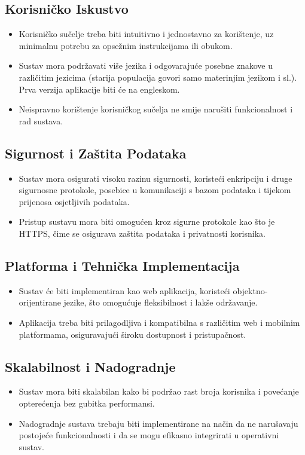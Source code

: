 \subsection*{Korisničko Iskustvo}
\begin{itemize}
    \item Korisničko sučelje treba biti intuitivno i jednostavno za korištenje, uz minimalnu potrebu za opsežnim instrukcijama ili obukom.
    \item Sustav mora podržavati više jezika i odgovarajuće posebne znakove u različitim jezicima (starija populacija govori samo materinjim jezikom i sl.). Prva verzija aplikacije biti će na engleskom. 
    \item Neispravno korištenje korisničkog sučelja ne smije narušiti funkcionalnost i rad sustava.
\end{itemize}

\subsection*{Sigurnost i Zaštita Podataka}
\begin{itemize}
    \item Sustav mora osigurati visoku razinu sigurnosti, koristeći enkripciju i druge sigurnosne protokole, posebice u komunikaciji s bazom podataka i tijekom prijenosa osjetljivih podataka.
    \item Pristup sustavu mora biti omogućen kroz sigurne protokole kao što je HTTPS, čime se osigurava zaštita podataka i privatnosti korisnika.
\end{itemize}

\subsection*{Platforma i Tehnička Implementacija}
\begin{itemize}
    \item Sustav će biti implementiran kao web aplikacija, koristeći objektno-orijentirane jezike, što omogućuje fleksibilnost i lakše održavanje.
    \item Aplikacija treba biti prilagodljiva i kompatibilna s različitim web i mobilnim platformama, osiguravajući široku dostupnost i pristupačnost.
\end{itemize}

\subsection*{Skalabilnost i Nadogradnje}
\begin{itemize}
    \item Sustav mora biti skalabilan kako bi podržao rast broja korisnika i povećanje opterećenja bez gubitka performansi.
    \item Nadogradnje sustava trebaju biti implementirane na način da ne narušavaju postojeće funkcionalnosti i da se mogu efikasno integrirati u operativni sustav.
\end{itemize}

